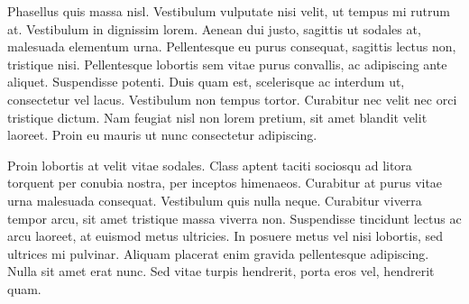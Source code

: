Phasellus quis massa nisl. Vestibulum vulputate nisi velit, ut tempus mi rutrum at. Vestibulum in dignissim lorem. Aenean dui justo, sagittis ut sodales at, malesuada elementum urna. Pellentesque eu purus consequat, sagittis lectus non, tristique nisi. Pellentesque lobortis sem vitae purus convallis, ac adipiscing ante aliquet. Suspendisse potenti. Duis quam est, scelerisque ac interdum ut, consectetur vel lacus. Vestibulum non tempus tortor. Curabitur nec velit nec orci tristique dictum. Nam feugiat nisl non lorem pretium, sit amet blandit velit laoreet. Proin eu mauris ut nunc consectetur adipiscing.

Proin lobortis at velit vitae sodales. Class aptent taciti sociosqu ad litora torquent per conubia nostra, per inceptos himenaeos. Curabitur at purus vitae urna malesuada consequat. Vestibulum quis nulla neque. Curabitur viverra tempor arcu, sit amet tristique massa viverra non. Suspendisse tincidunt lectus ac arcu laoreet, at euismod metus ultricies. In posuere metus vel nisi lobortis, sed ultrices mi pulvinar. Aliquam placerat enim gravida pellentesque adipiscing. Nulla sit amet erat nunc. Sed vitae turpis hendrerit, porta eros vel, hendrerit quam.
